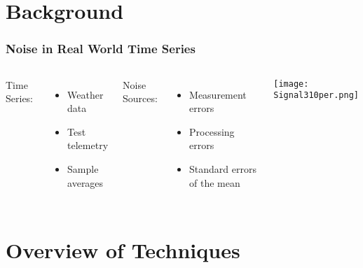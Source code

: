 \documentclass{beamer}
\begin{document}
\section{Background}

\begin{frame}
\frametitle{Noise in Real World Time Series}

\begin{columns}

\column{1.5 in}

Time Series: 

\begin{itemize}

\item Weather data

\item Test telemetry

\item Sample averages

\end{itemize}

$ $\\

Noise Sources:\\

\begin{itemize}

\item Measurement errors

\item Processing errors

\item Standard errors of the mean

\end{itemize}

\column{3 in}

\centering

\texttt{[image: Signal310per.png]}

\end{columns}

\end{frame}

\section{Overview of Techniques}
\end{document}

